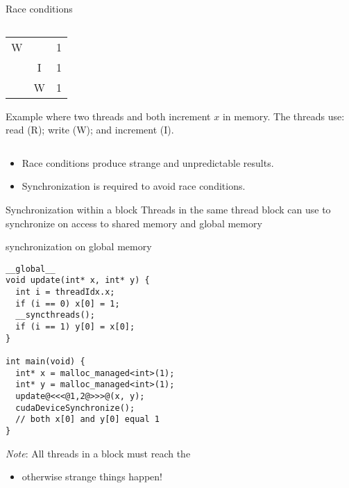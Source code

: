 \documentclass[aspectratio=43]{beamer}
\begin{document}
\begin{frame}[fragile]{Race conditions}
\begin{columns}[T]
\begin{column}[T]{0.55\textwidth}
\begin{center}
\begin{tabular}[]{|ccc|}
              W   &      &  1\\
                  &  I   &  1\\
                  &  W   &  1\\
            \hline
        \end{tabular}
        \end{center}
        \begin{center}
            \scriptsize
            Example where two threads  and  both increment $x$ in memory. The threads use: read (R); write (W); and increment (I).
        \end{center}
    \end{column}
\end{columns}

    \begin{itemize}
        \item Race conditions produce strange and unpredictable results.
        \item Synchronization is required to avoid race conditions.
    \end{itemize}
\end{frame}


\begin{frame}[fragile]{Synchronization within a block}
    Threads in the same thread block can use  to synchronize on access to shared memory and global memory

    \begin{code}{synchronization on global memory}
        \begin{lstlisting}[style=boxcudatiny]
__global__
void update(int* x, int* y) {
  int i = threadIdx.x;
  if (i == 0) x[0] = 1;
  __syncthreads();
  if (i == 1) y[0] = x[0];
}

int main(void) {
  int* x = malloc_managed<int>(1);
  int* y = malloc_managed<int>(1);
  update@<<<@1,2@>>>@(x, y);
  cudaDeviceSynchronize();
  // both x[0] and y[0] equal 1
}
        \end{lstlisting}
    \end{code}

    \emph{Note}: All threads in a block must reach the 
    \begin{itemize}
        \item otherwise strange things happen!
    \end{itemize}
\end{frame}
\end{document}
